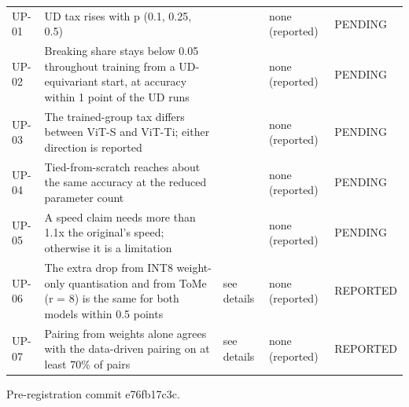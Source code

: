 \begin{table}[t]
\begin{tabular}{lllll}
UP-01 & UD tax rises with p (0.1, 0.25, 0.5) &  & none (reported) & PENDING \\
UP-02 & Breaking share stays below 0.05 throughout training from a UD-equivariant start, at accuracy within 1 point of the UD runs &  & none (reported) & PENDING \\
UP-03 & The trained-group tax differs between ViT-S and ViT-Ti; either direction is reported &  & none (reported) & PENDING \\
UP-04 & Tied-from-scratch reaches about the same accuracy at the reduced parameter count &  & none (reported) & PENDING \\
UP-05 & A speed claim needs more than 1.1x the original's speed; otherwise it is a limitation &  & none (reported) & PENDING \\
UP-06 & The extra drop from INT8 weight-only quantisation and from ToMe (r = 8) is the same for both models within 0.5 points & see details & none (reported) & REPORTED \\
UP-07 & Pairing from weights alone agrees with the data-driven pairing on at least 70\% of pairs & see details & none (reported) & REPORTED \\
\bottomrule
\end{tabular}
\par\smallskip\footnotesize Pre-registration commit e76fb17c3c.
\end{table}
